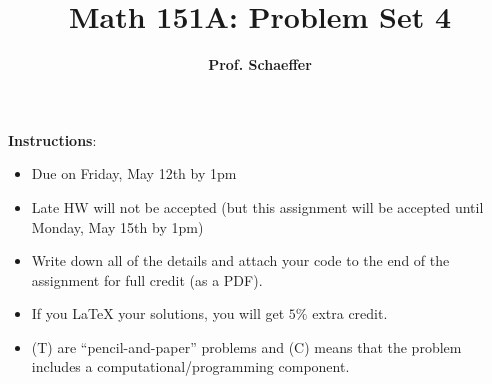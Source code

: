 \documentclass[12pt]{article}
\title{\bf Math 151A: Problem Set 4}
\date{ }
\author{\bf Prof. Schaeffer}
\begin{document}
\maketitle


{\small \textbf{Instructions}:
\begin{itemize}
\item Due on Friday, May 12th by 1pm 
\item Late HW will not be accepted (but this assignment will be accepted until Monday, May 15th by 1pm)
\item Write down all of the details and attach your code to the end of the assignment for full credit (as a PDF).  
\item If you LaTeX your solutions, you will get $5\%$ extra credit. 
\item (T) are ``pencil-and-paper'' problems and (C) means that the problem includes a computational/programming component. 
\end{itemize}}

\vspace{1em}
\end{document}
